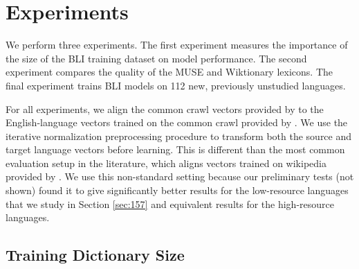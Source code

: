 \documentclass[11pt]{article}
\begin{document}
\section{Experiments}
\label{sec:exp}

%

We perform three experiments.
The first experiment measures the importance of the size of the BLI training dataset on model performance.
The second experiment compares the quality of the MUSE and Wiktionary lexicons.
The final experiment trains BLI models on 112 new, previously unstudied languages.

For all experiments, we align the common crawl vectors provided by \citet{grave2018learning} to the English-language vectors trained on the common crawl provided by \citet{mikolov2018advances}.
We use the iterative normalization preprocessing procedure \citep{zhang2019girls} to transform both the source and target language vectors before learning.
This is different than the most common evaluation setup in the literature, which aligns vectors trained on wikipedia provided by \citet{bojanowski2017enriching}.
We use this non-standard setting because our preliminary tests (not shown) found it to give significantly better results for the low-resource languages that we study in Section \ref{sec:157} and equivalent results for the high-resource languages.

\subsection{Training Dictionary Size}
\label{sec:dictsize}
\end{document}
